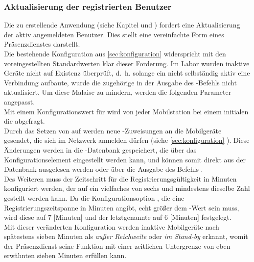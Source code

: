 \subsubsection{Aktualisierung der registrierten Benutzer}
Die zu erstellende Anwendung (siehe Kapitel  und ) fordert eine Aktualisierung der aktiv angemeldeten Benutzer. Dies stellt eine vereinfachte Form eines Präsenzdienstes darstellt.\\
Die bestehende Konfiguration aus \autoref{sec:konfiguration} widerspricht mit den voreingestellten Standardwerten klar dieser Forderung. 
Im Labor wurden inaktive Geräte nicht auf Existenz überprüft, d.~h. solange ein \UE nicht selbständig aktiv eine Verbindung aufbaute, wurde die zugehörige \IMSI in der Ausgabe des -Befehls nicht aktualisiert. Um diese Malaise  zu mindern, werden die folgenden Parameter angepasst.\\
Mit einem Konfigurationswert  für  wird von jeder Mobilstation bei einem initialen \LUR die \IMEI abgefragt.\\
Durch das Setzen von  auf  werden neue \TMSI-Zuweisungen an die Mobilgeräte gesendet, die sich im Netzwerk anmelden dürfen (siehe \autoref{sec:konfiguration} ). Diese Änderungen werden in die \TMSI-Datenbank gespeichert, die über das Konfigurationselement  eingestellt werden kann, und können somit direkt aus der Datenbank ausgelesen werden oder über die Ausgabe des Befehls .\\
Des Weiteren muss der Zeitschritt für die Registrierungsgültigkeit in Minuten  konfiguriert werden, der auf ein vielfaches von sechs und mindestens dieselbe Zahl gestellt werden kann. Da die Konfigurationsoption , die eine Registrierungszeitspanne in Minuten angibt, echt größer dem -Wert sein muss, wird diese auf 7 [Minuten] und der letztgenannte auf 6 [Minuten] festgelegt.\\
Mit dieser veränderten Konfiguration werden inaktive Mobilgeräte nach spätestens sieben Minuten als \emph{außer Reichweite} oder \emph{im Stand-by} erkannt, womit der Präsenzdienst seine Funktion mit einer zeitlichen Untergrenze von eben erwähnten sieben Minuten erfüllen kann.
